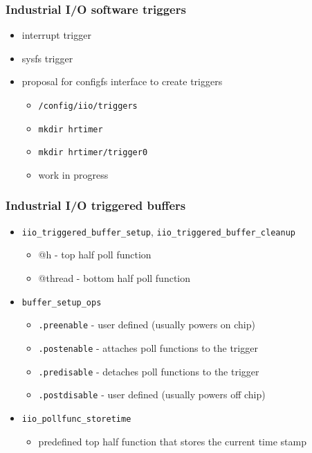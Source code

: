 \documentclass[aspectratio=169]{beamer}
\begin{document}

\begin{frame}
\frametitle{Industrial I/O software triggers}
\begin{itemize}
    \item interrupt trigger
    \item sysfs trigger
    \item proposal for configfs interface to create triggers
    \begin{itemize}
        \item \texttt{/config/iio/triggers}
        \item \texttt{mkdir hrtimer}
        \item \texttt{mkdir hrtimer/trigger0}
        \item work in progress
    \end{itemize}
\end{itemize}
\end{frame}


\begin{frame}
\frametitle{Industrial I/O triggered buffers}
\begin{itemize}
    \item \texttt{iio\_triggered\_buffer\_setup}, \texttt{iio\_triggered\_buffer\_cleanup}
    \begin{itemize}
        \item @h - top half poll function
        \item @thread - bottom half poll function
    \end{itemize}
    \item \texttt{buffer\_setup\_ops}
        \begin{itemize}
            \item \texttt{.preenable} - user defined (usually powers on chip)
            \item \texttt{.postenable} - attaches poll functions to the trigger
            \item \texttt{.predisable} - detaches poll functions to the trigger
            \item \texttt{.postdisable} - user defined (usually powers off chip)
        \end{itemize}
    \item \texttt{iio\_pollfunc\_storetime}
    \begin{itemize}
        \item predefined top half function that stores the current time stamp
    \end{itemize}
\end{itemize}
\end{frame}
\end{document}
